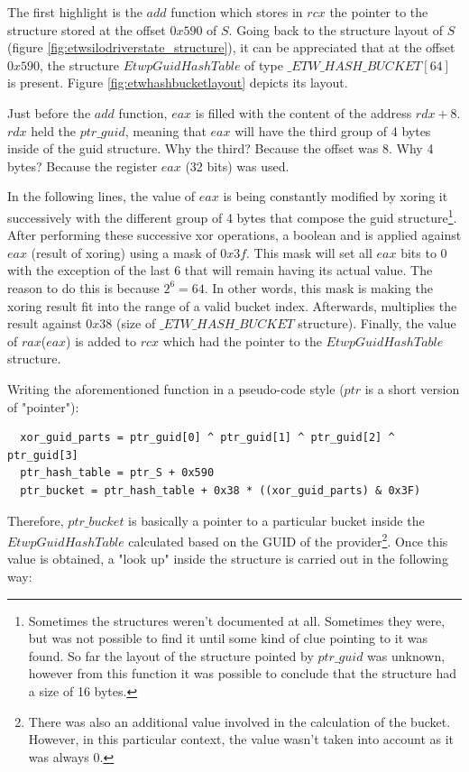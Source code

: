   The first highlight is the $add$ function which stores in $rcx$ the pointer to the structure stored at the offset $0x590$ of $S$. Going back to the structure layout of $S$ (figure \ref{fig:etwsilodriverstate_structure}), it can be appreciated that at the offset $0x590$, the structure $EtwpGuidHashTable$ of type $\_ETW\_HASH\_BUCKET[64]$ is present. Figure \ref{fig:etwhashbucketlayout} depicts its layout.

  Just before the $add$ function, $eax$ is filled with the content of the address $rdx+8$. $rdx$ held the $ptr\_guid$, meaning that $eax$ will have the third group of 4 bytes inside of the guid structure. Why the third? Because the offset was 8. Why 4 bytes? Because the register $eax$ (32 bits) was used.

  In the following lines, the value of $eax$ is being constantly modified by xoring it successively with the different group of 4 bytes that compose the guid structure\footnote{Sometimes the structures weren't documented at all. Sometimes they were, but was not possible to find it until some kind of clue pointing to it was found.  So far the layout of the structure pointed by $ptr\_guid$ was unknown, however from this function it was possible to conclude that the structure had a size of 16 bytes.}. After performing these successive xor operations, a boolean and is applied against $eax$ (result of xoring) using a mask of $0x3f$. This mask will set all $eax$ bits to 0 with the exception of the last 6 that will remain having its actual value. The reason to do this is because $2^6 = 64$. In other words, this mask is making the xoring result fit into the range of a valid bucket index. Afterwards, multiplies the result against $0x38$ (size of $\_ETW\_HASH\_BUCKET$ structure). Finally, the value of $rax$($eax$) is added to $rcx$ which had the pointer to the $EtwpGuidHashTable$ structure. 

  Writing the aforementioned function in a pseudo-code style ($ptr$ is a short version of "pointer"): 
  \begin{verbatim}
  xor_guid_parts = ptr_guid[0] ^ ptr_guid[1] ^ ptr_guid[2] ^ ptr_guid[3]
  ptr_hash_table = ptr_S + 0x590
  ptr_bucket = ptr_hash_table + 0x38 * ((xor_guid_parts) & 0x3F) 
  \end{verbatim}

  Therefore, $ptr\_bucket$ is basically a pointer to a particular bucket inside the $EtwpGuidHashTable$ calculated based on the GUID of the provider\footnote{There was also an additional value involved in the calculation of the bucket. However, in this particular context, the value wasn't taken into account as it was always 0. }. 
  Once this value is obtained, a "look up" inside the structure is carried out in the following way:

